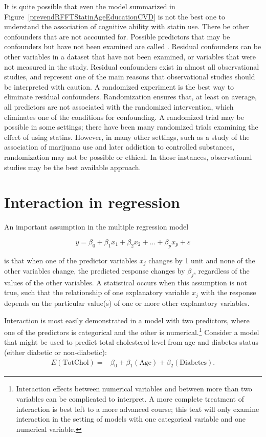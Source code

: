It is quite possible that even the model summarized in Figure~\ref{prevendRFFTStatinAgeEducationCVD} is not the best one to understand the association of cognitive ability with statin use. There be other confounders that are not accounted for.  Possible predictors that may be confounders but have not been examined are called .  Residual confounders can be other variables in a dataset that have not been examined, or variables that were not measured in the study.  Residual confounders exist in almost all observational studies, and represent one of the main reasons that observational studies should be interpreted with caution. A randomized experiment is the best way to eliminate residual confounders. Randomization ensures that, at least on average, all predictors are not associated with the randomized intervention, which eliminates one of the conditions for confounding.  A randomized trial may be possible in some settings; there have been many randomized trials examining the effect of using statins. However, in many other settings, such as a study of the association of marijuana use and later addiction to controlled substances, randomization may not be possible or ethical.  In those instances, observational studies may be the best available approach.



\section{Interaction in regression}
\label{interactionRegression}

An important assumption in the multiple regression model

\[y = \beta_0 + \beta_1x_1 + \beta_2x_2 + ... + \beta_px_p + \varepsilon \] 

is that when one of the predictor variables $x_j$ changes by 1 unit and none of the other variables change, the predicted response changes by $\beta_j$, regardless of the values of the other variables.  A statistical  occurs when this assumption is not true, such that the relationship of one explanatory variable $x_j$ with the response depends on the particular value(s) of one or more other explanatory variables.

Interaction is most easily demonstrated in a model with two predictors, where one of the predictors is categorical and the other is numerical.\footnote{Interaction effects between numerical variables and between more than two variables can be complicated to interpret. A more complete treatment of interaction is best left to a more advanced course; this text will only examine interaction in the setting of models with one categorical variable and one numerical variable.} Consider a model that might be used to predict total cholesterol level from age and diabetes status (either diabetic or non-diabetic):
\begin{align}
E(\text{TotChol}) =& \beta_0 + \beta_1(\text{Age}) + \beta_2(\text{Diabetes}).
\label{nhanesAgeDiabetesModel}
\end{align}

